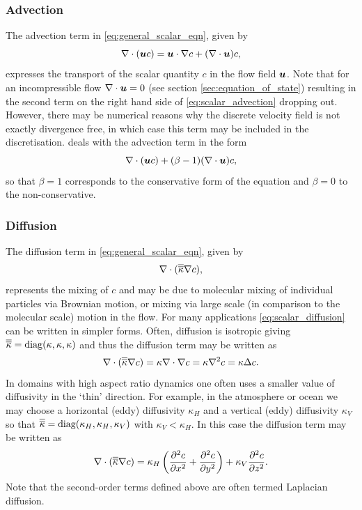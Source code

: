 \subsubsection{Advection}\label{sec:MP-AdvdifEqn-adv}
The advection term in \eqref{eq:general_scalar_eqn}, given by
\begin{equation}\label{eq:scalar_advection}
\nabla\cdot(\bmu c) = \bmu\cdot\nabla c + (\nabla\cdot\bmu)c,
\end{equation}
expresses the transport of the scalar quantity $c$ in the flow field $\bmu$. Note that for an incompressible flow $\nabla\cdot\bmu=0$ (see section \ref{sec:equation_of_state}) resulting in the second term on the right hand side of \eqref{eq:scalar_advection} dropping out. However, there may be numerical
reasons why the discrete velocity field is not exactly divergence free, in which case this term may
be included in the discretisation. {\fluidity} deals with the advection term in the form
\begin{equation}\label{eq:fluidity_scalar_advection}
\nabla\cdot(\bmu c) + (\beta-1)(\nabla\cdot\bmu)c,
\end{equation}
so that $\beta=1$ corresponds to the conservative form of the equation and $\beta=0$ to the non-conservative.

\subsubsection{Diffusion}\label{sec:MP-AdvdifEqn-diff}
The diffusion term in \eqref{eq:general_scalar_eqn}, given by
\begin{equation}\label{eq:scalar_diffusion}
\nabla\cdot(\kaptens\nabla c),
\end{equation}
represents the mixing of $c$ and may be due to
molecular mixing of individual particles via Brownian motion, or mixing via large scale (in comparison to the
molecular scale) motion in the flow. For many applications \eqref{eq:scalar_diffusion} can be written in simpler forms. Often, diffusion is isotropic giving $\kaptens = \mathrm{diag}(\kappa,\kappa,\kappa)$ and thus the diffusion term
may be written as
\begin{equation}\label{eq:scalar_isotropic_diffusion}
\nabla\cdot(\kaptens\nabla c) = \kappa\nabla\cdot\nabla c = \kappa\nabla^2 c = \kappa\Delta c.
\end{equation}
In domains with high aspect ratio dynamics one often uses a smaller value of diffusivity in the `thin'
direction. For example, in the atmosphere or ocean we may choose a horizontal (eddy) diffusivity $\kappa_H$ and a
vertical (eddy) diffusivity $\kappa_V$ so that $\kaptens = \mathrm{diag}(\kappa_H,\kappa_H,\kappa_V)$ with $\kappa_V < \kappa_H$.
In this case the diffusion term may be written as
\begin{equation}\label{eq:scalar_anisotropic_diffusion}
\nabla\cdot(\kaptens\nabla c) = \kappa_H \left(\pptt[x]{c} + \pptt[y]{c}\right) + \kappa_V \pptt[z]{c}.
\end{equation}
Note that the second-order terms defined above are often termed Laplacian diffusion.


